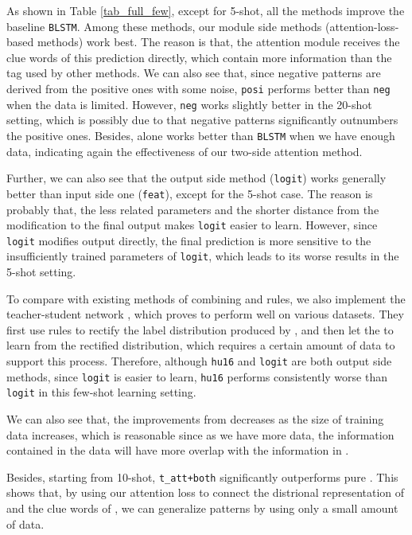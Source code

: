 As shown in Table \ref{tab_full_few}, except for 5-shot, all the methods improve the baseline \texttt{BLSTM}.
Among these methods, our \NN module side methods (attention-loss-based methods) work best.
The reason is that, the attention module receives the clue words of this prediction directly, which contain more information than the \RE tag used by other methods.
We can also see that, since negative patterns are derived from the positive ones with some noise, \texttt{posi} performs better than \texttt{neg} when the data is limited.
However, \texttt{neg} works slightly better in the 20-shot setting, which is possibly due to that negative patterns significantly outnumbers the positive ones.
Besides, \tatt alone works better than \texttt{BLSTM} when we have enough data, indicating again the effectiveness of our two-side attention method.

Further, we can also see that the output side method (\texttt{logit}) works generally better than input side one (\texttt{feat}), except for the 5-shot case.
The reason is probably that, the less \RE related parameters and the shorter distance from the modification to the final output makes \texttt{logit} easier to learn.
However, since \texttt{logit} modifies output directly, the final prediction is more sensitive to the insufficiently trained parameters of \texttt{logit}, which leads to its worse results in the 5-shot setting.

To compare with existing methods of combining \NN and rules, we also implement the teacher-student network \cite{liu2016attention}, which proves to perform well on various datasets.
They first use \FOL rules to rectify the label distribution produced by \NN, and then let the \NN to learn from the rectified distribution, which requires a certain amount of data to support this process.
Therefore, although \texttt{hu16} and \texttt{logit} are both output side methods, since \texttt{logit} is easier to learn,
\texttt{hu16} performs consistently worse than \texttt{logit} in this few-shot learning setting.

We can also see that, the improvements from \RE decreases as the size of training data increases,
which is reasonable since as we have more data, the information contained in the data will have more overlap with the information in \RE.

Besides, starting from 10-shot, \texttt{t\_att+both} significantly outperforms pure \RE.
This shows that, by using our attention loss to connect the distrional representation of \NN and the clue words of \RE, we can generalize \RE patterns by using only a small amount of data.


